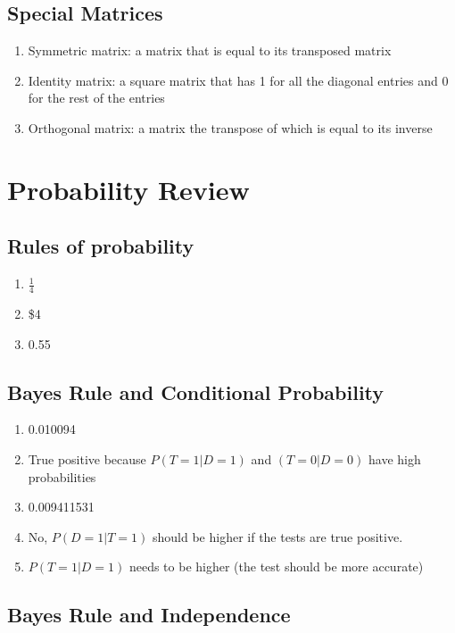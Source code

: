 \documentclass{article}
\def\enum#1{\begin{enumerate}#1\end{enumerate}}
\begin{document}
\subsection{Special Matrices}

\enum{
\item Symmetric matrix: a matrix that is equal to its transposed matrix
\item Identity matrix: a square matrix that has 1 for all the diagonal entries and 0 for the rest of the entries
\item Orthogonal matrix: a matrix the transpose of which is equal to its inverse
}



\section{Probability Review}



\subsection{Rules of probability}

\begin{enumerate}
\item $\frac{1}{4}$
\item \$4
\item 0.55
\end{enumerate}


\subsection{Bayes Rule and Conditional Probability}

\begin{enumerate}
\item 0.010094
\item True positive because $P(T=1|D=1)$ and $(T=0|D=0)$ have high probabilities
\item 0.009411531
\item No, $P(D=1|T=1)$ should be higher if the tests are true positive.
\item $P(T=1|D=1)$ needs to be higher (the test should be more accurate)
\end{enumerate}

\subsection{Bayes Rule and Independence}
\end{document}
